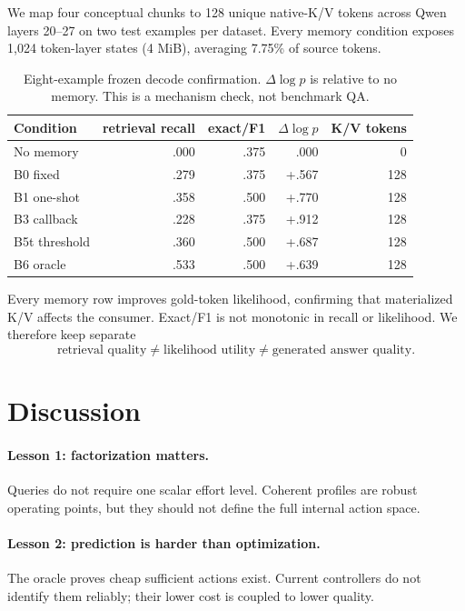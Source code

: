 \documentclass[11pt]{article}
\begin{document}
We map four conceptual chunks to 128 unique native-K/V tokens across Qwen layers 20--27 on two test
examples per dataset. Every memory condition exposes 1,024 token-layer states (4 MiB), averaging
7.75\% of source tokens.

\begin{table}[H]
\centering
\small
\caption{Eight-example frozen decode confirmation. $\Delta\log p$ is relative to no memory. This
is a mechanism check, not benchmark QA.}
\label{tab:decode}
\begin{tabular}{lrrrr}
\toprule
Condition & retrieval recall & exact/F1 & $\Delta\log p$ & K/V tokens\\
\midrule
No memory & .000 & .375 & .000 & 0\\
B0 fixed & .279 & .375 & +.567 & 128\\
B1 one-shot & .358 & .500 & +.770 & 128\\
B3 callback & .228 & .375 & +.912 & 128\\
B5t threshold & .360 & .500 & +.687 & 128\\
B6 oracle & .533 & .500 & +.639 & 128\\
\bottomrule
\end{tabular}
\end{table}

Every memory row improves gold-token likelihood, confirming that materialized K/V affects the
consumer. Exact/F1 is not monotonic in recall or likelihood. We therefore keep separate
\[
\text{retrieval quality}\neq\text{likelihood utility}\neq\text{generated answer quality}.
\]

\section{Discussion}

\paragraph{Lesson 1: factorization matters.}
Queries do not require one scalar effort level. Coherent profiles are robust operating points, but
they should not define the full internal action space.

\paragraph{Lesson 2: prediction is harder than optimization.}
The oracle proves cheap sufficient actions exist. Current controllers do not identify them
reliably; their lower cost is coupled to lower quality.
\end{document}
